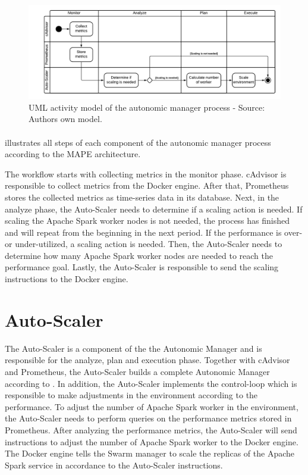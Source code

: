 \begin{figure}[h]
\centering
\includegraphics[scale=0.50]{images/05_conceptual_design/autonomic_manager/autonomic_manager_workflow}
\caption{UML activity model of the autonomic manager process - Source: Authors own model.}
\label{fig:am-workflow}
\end{figure}
\paragraph{}  illustrates all steps of each component of the autonomic manager process according to the MAPE architecture.


The workflow starts with collecting metrics in the monitor phase. cAdvisor is responsible to collect metrics from the Docker engine. After that, Prometheus stores the collected metrics as time-series data in its database.
Next, in the analyze phase, the Auto-Scaler needs to determine if a scaling action is needed. If scaling the Apache Spark worker nodes is not needed, the process has finished and will repeat from the beginning in the next period.
If the performance is over- or under-utilized, a scaling action is needed. Then, the Auto-Scaler needs to determine how many Apache Spark worker nodes are needed to reach the performance goal.
Lastly, the Auto-Scaler is responsible to send the scaling instructions to the Docker engine.


\section{Auto-Scaler}
\label{sec:05_auto-scaler}
The Auto-Scaler is a component of the the Autonomic Manager and is responsible for the analyze, plan and execution phase.
Together with cAdvisor and Prometheus, the Auto-Scaler builds a complete Autonomic Manager according to .
In addition, the Auto-Scaler implements the control-loop which is responsible to make adjustments in the environment according to the performance.
To adjust the number of Apache Spark worker in the environment, the Auto-Scaler needs to perform queries on the performance metrics stored in Prometheus.
After analyzing the performance metrics, the Auto-Scaler will send instructions to adjust the number of Apache Spark worker to the Docker engine. The Docker engine tells the Swarm manager to scale the replicas of the Apache Spark service in accordance to the Auto-Scaler instructions.

